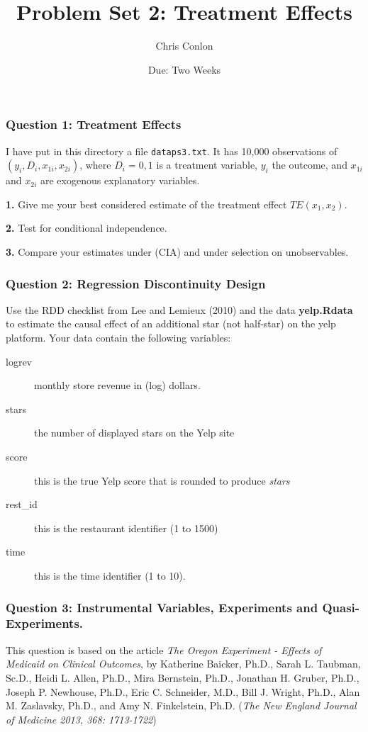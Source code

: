 \documentclass[11pt,letterpaper]{article}
\title{Problem Set 2: Treatment Effects}
\author{Chris Conlon }
\begin{document}
\date{Due:  Two Weeks}
\maketitle

\subsubsection*{Question 1: Treatment Effects}
I have put in this directory a file \texttt{dataps3.txt}. It has    10,000 observations of
$(y_i,D_i,x_{1i},x_{2i})$, where $D_i=0,1$ is a treatment variable, $y_i$ the outcome, and $x_{1i}$ and $x_{2i}$ are exogenous explanatory variables. 

\medskip 

{\bf 1.} Give me your best considered estimate of the
treatment effect $TE(x_1,x_2)$.

\medskip

{\bf 2.} Test for conditional
independence.

\medskip

{\bf 3.} Compare your estimates under (CIA) and under
selection on unobservables.

\subsubsection*{Question 2: Regression Discontinuity Design}

Use the RDD checklist from Lee and Lemieux (2010) and the data \textbf{yelp.Rdata} to estimate the causal effect of an additional star (not half-star) on the yelp platform.  Your data contain the following variables:

\begin{description}
\item[logrev] monthly store revenue in (log) dollars.
\item[stars] the number of displayed stars on the Yelp site
\item[score] this is the true Yelp score that is rounded to produce \textit{stars}
\item[rest\_id] this is the restaurant identifier (1 to 1500)
\item[time] this is the time identifier (1 to 10).
\end{description}


\subsubsection*{Question 3: Instrumental Variables, Experiments and Quasi-Experiments.}
This question is based on the article \textit{The Oregon Experiment - Effects of Medicaid on Clinical Outcomes}, by Katherine Baicker, Ph.D., Sarah L. Taubman, Sc.D., Heidi L. Allen, Ph.D., Mira Bernstein, Ph.D., Jonathan H. Gruber, Ph.D., Joseph P. Newhouse, Ph.D., Eric C. Schneider, M.D., Bill J. Wright, Ph.D., Alan M. Zaslavsky, Ph.D., and Amy N. Finkelstein, Ph.D. (\textit{The New England Journal of Medicine 2013, 368: 1713-1722})
\end{document}
